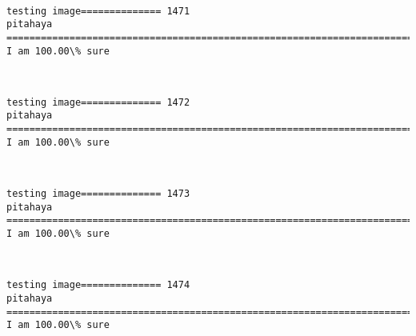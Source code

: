 \documentclass[11pt]{article}
\begin{document}
    \begin{center}
    \end{center}
    { \hspace*{\fill} \\}
    
    \begin{Verbatim}[commandchars=\\\{\}]
testing image============== 1471
pitahaya
============================================================================
I am 100.00\% sure

    \end{Verbatim}

    \begin{center}
    \end{center}
    { \hspace*{\fill} \\}
    
    \begin{Verbatim}[commandchars=\\\{\}]
testing image============== 1472
pitahaya
============================================================================
I am 100.00\% sure

    \end{Verbatim}

    \begin{center}
    \end{center}
    { \hspace*{\fill} \\}
    
    \begin{Verbatim}[commandchars=\\\{\}]
testing image============== 1473
pitahaya
============================================================================
I am 100.00\% sure

    \end{Verbatim}

    \begin{center}
    \end{center}
    { \hspace*{\fill} \\}
    
    \begin{Verbatim}[commandchars=\\\{\}]
testing image============== 1474
pitahaya
============================================================================
I am 100.00\% sure

    \end{Verbatim}
\end{document}
